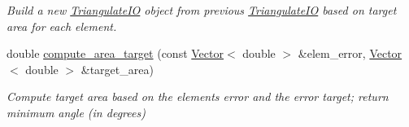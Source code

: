 \begin{DoxyCompactItemize}
\begin{DoxyCompactList}\small\item\em Build a new \hyperlink{structoomph_1_1TriangulateIO}{Triangulate\+IO} object from previous \hyperlink{structoomph_1_1TriangulateIO}{Triangulate\+IO} based on target area for each element. \end{DoxyCompactList}\item 
double \hyperlink{classoomph_1_1RefineableTriangleMesh_a0e2797cd90b0f9afabac4ec28576de05}{compute\+\_\+area\+\_\+target} (const \hyperlink{classoomph_1_1Vector}{Vector}$<$ double $>$ \&elem\+\_\+error, \hyperlink{classoomph_1_1Vector}{Vector}$<$ double $>$ \&target\+\_\+area)
\begin{DoxyCompactList}\small\item\em Compute target area based on the element\textquotesingle{}s error and the error target; return minimum angle (in degrees) \end{DoxyCompactList}\end{DoxyCompactItemize}
